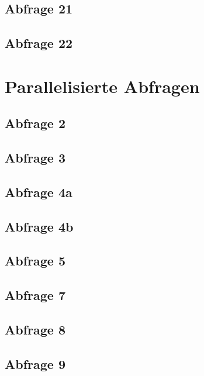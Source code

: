 \subsection{Abfrage 21}

\subsection{Abfrage 22}


\section{Parallelisierte Abfragen}
\subsection{Abfrage 2}

\subsection{Abfrage 3}

\subsection{Abfrage 4a}

\subsection{Abfrage 4b}

\subsection{Abfrage 5}

\subsection{Abfrage 7}

\newpage
\subsection{Abfrage 8}

\subsection{Abfrage 9}

